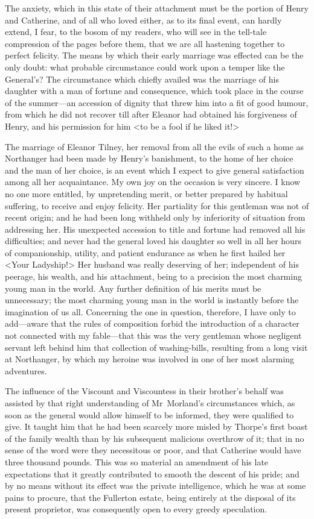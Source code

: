  The anxiety, which in this state of their attachment must be the portion of Henry and Catherine, and of all who loved either, as to its final event, can hardly extend, I fear, to the bosom of my readers, who will see in the tell-tale compression of the pages before them, that we are all hastening together to perfect felicity. The means by which their early marriage was effected can be the only doubt: what probable circumstance could work upon a temper like the General's? The circumstance which chiefly availed was the marriage of his daughter with a man of fortune and consequence, which took place in the course of the summer—an accession of dignity that threw him into a fit of good humour, from which he did not recover till after Eleanor had obtained his forgiveness of Henry, and his permission for him <to be a fool if he liked it!> 

 The marriage of Eleanor Tilney, her removal from all the evils of such a home as Northanger had been made by Henry's banishment, to the home of her choice and the man of her choice, is an event which I expect to give general satisfaction among all her acquaintance. My own joy on the occasion is very sincere. I know no one more entitled, by unpretending merit, or better prepared by habitual suffering, to receive and enjoy felicity. Her partiality for this gentleman was not of recent origin; and he had been long withheld only by inferiority of situation from addressing her. His unexpected accession to title and fortune had removed all his difficulties; and never had the general loved his daughter so well in all her hours of companionship, utility, and patient endurance as when he first hailed her <Your Ladyship!> Her husband was really deserving of her; independent of his peerage, his wealth, and his attachment, being to a precision the most charming young man in the world. Any further definition of his merits must be unnecessary; the most charming young man in the world is instantly before the imagination of us all. Concerning the one in question, therefore, I have only to add—aware that the rules of composition forbid the introduction of a character not connected with my fable—that this was the very gentleman whose negligent servant left behind him that collection of washing-bills, resulting from a long visit at Northanger, by which my heroine was involved in one of her most alarming adventures. 

 The influence of the Viscount and Viscountess in their brother's behalf was assisted by that right understanding of Mr~Morland's circumstances which, as soon as the general would allow himself to be informed, they were qualified to give. It taught him that he had been scarcely more misled by Thorpe's first boast of the family wealth than by his subsequent malicious overthrow of it; that in no sense of the word were they necessitous or poor, and that Catherine would have three thousand pounds. This was so material an amendment of his late expectations that it greatly contributed to smooth the descent of his pride; and by no means without its effect was the private intelligence, which he was at some pains to procure, that the Fullerton estate, being entirely at the disposal of its present proprietor, was consequently open to every greedy speculation. 

